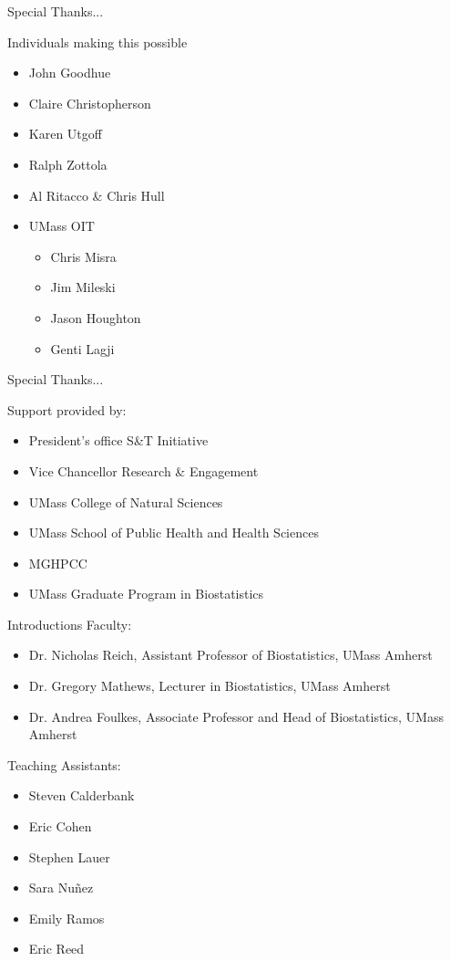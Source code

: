 \documentclass[table]{beamer}\usepackage[]{graphicx}\usepackage[]{color}
\begin{document}
\begin{frame}{Special Thanks...}

\begin{block}{Individuals making this possible}
\begin{itemize}
\item John Goodhue
\item Claire Christopherson
\item Karen Utgoff
\item Ralph Zottola
\item Al Ritacco \& Chris Hull
\item UMass OIT 
\begin{itemize}
\item Chris Misra
\item Jim Mileski
\item Jason Houghton
\item Genti Lagji
\end{itemize}
\end{itemize}
\end{block}
\end{frame}


\begin{frame}{Special Thanks...}

\begin{block}{Support provided by:}
\begin{itemize}
\item President's office S\&T Initiative
\item Vice Chancellor Research \& Engagement
\item UMass College of Natural Sciences
\item UMass School of Public Health and Health Sciences
\item MGHPCC
\item UMass Graduate Program in Biostatistics
\end{itemize}
\end{block}
\end{frame}

\begin{frame}{Introductions}
Faculty:
\begin{itemize}
\item Dr. Nicholas Reich, Assistant Professor of Biostatistics, UMass Amherst
\item Dr. Gregory Mathews, Lecturer in Biostatistics, UMass Amherst
\item Dr. Andrea Foulkes, Associate Professor and Head of Biostatistics, UMass Amherst
\end{itemize}

\bigskip
Teaching Assistants:
\begin{itemize}
\item Steven Calderbank
\item Eric Cohen
\item Stephen Lauer
\item Sara Nu\~nez
\item Emily Ramos
\item Eric Reed
\end{itemize}
\end{frame}
\end{document}

